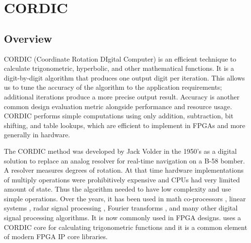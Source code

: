 
\chapter{CORDIC}
\glsresetall
\label{chapter:cordic}

\section{Overview}
\label{subsec:CORDIC_Overview}


CORDIC (Coordinate Rotation DIgital Computer) is an efficient technique to calculate trigonometric, hyperbolic, and other mathematical functions. It is a digit-by-digit algorithm that produces one output digit per iteration. This allows us to tune the accuracy of the algorithm to the application requirements; additional iterations produce a more precise output result. Accuracy is another common design evaluation metric alongside performance and resource usage. CORDIC performs simple computations using only addition, subtraction, bit shifting, and table lookups, which are efficient to implement in FPGAs and more generally in hardware. 

\begin{aside}
The CORDIC method was developed by Jack Volder in the 1950's as a digital solution to replace an analog resolver for real-time navigation on a B-58 bomber. A resolver measures degrees of rotation. At that time hardware implementations of multiply operations were prohibitively expensive and CPUs had very limited amount of state. Thus the algorithm needed to have low complexity and use simple operations.  Over the years, it has been used in math co-processors \cite{duprat1993cordic}, linear systems \cite{ahmed1982highly}, radar signal processing \cite{andraka1996building}, Fourier transforms \cite{despain1974fourier}, and many other digital signal processing algorithms. It is now commonly used in FPGA designs. \VHLS uses a CORDIC core for calculating trigonometric functions and it is a common element of modern FPGA IP core libraries.
\end{aside}

